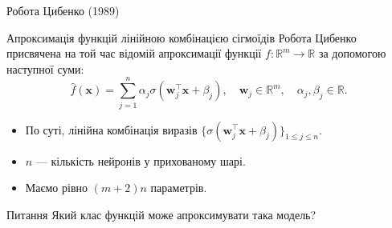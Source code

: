\documentclass{zkdl-presentation-template}
\begin{document}
    \begin{frame}{Робота Цибенко (1989)}
        \begin{block}{Апроксимація функцій лінійною комбінацією сігмоїдів}
            Робота Цибенко \cite{cybenko} присвячена на той час відомій апроксимації функції $f:
            \mathbb{R}^m \to \mathbb{R}$ за допомогою наступної суми:
            \begin{equation*}\label{eq:cybenko-g}
                \hat{f}(\boldsymbol{x}) = \sum_{j=1}^n \alpha_j \sigma(\boldsymbol{w}_j^{\top}\boldsymbol{x} + \beta_j), \quad \boldsymbol{w}_j \in \mathbb{R}^m, \quad \alpha_j,\beta_j \in \mathbb{R}.
            \end{equation*}
            \begin{itemize}
                \item По суті, лінійна комбінація виразів $\{\sigma(\boldsymbol{w}_j^{\top}\boldsymbol{x} + \beta_j)\}_{1 \leq j \leq n}$.
                \item $n$ --- кількість нейронів у прихованому шарі.
                \item Маємо рівно $(m+2)n$ параметрів.
            \end{itemize}
            
        \end{block}

        \begin{alertblock}{Питання}
            Який клас функцій може апроксимувати така модель?
        \end{alertblock}
    \end{frame}
\end{document}
